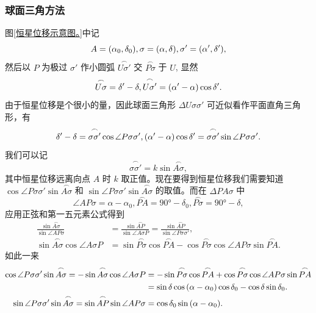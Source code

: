 \documentclass[UTF8, 12pt, a4paper, oneside, onecolumn, fontset=none]{ctexart}
\begin{document}
\subsubsection{球面三角方法}
图\ref{恒星位移示意图。}中记
\begin{equation}
A=\mleft(\alpha_{0},\delta_{0}\mright),\sigma=\mleft(\alpha,\delta\mright),\sigma'=\mleft(\alpha',\delta'\mright),
\end{equation}
然后以 $P$ 为极过 $\sigma'$ 作小圆弧 $\overset{\frown}{U\sigma'}$ 交 $\overset{\frown}{P\sigma}$ 于 $U$, 显然
\begin{equation}
\overset{\frown}{U\sigma}=\delta'-\delta,\overset{\frown}{U\sigma'}=\mleft(\alpha'-\alpha\mright)\cos{\delta'}.
\end{equation}
由于恒星位移是个很小的量，因此球面三角形 $\Delta{}U\sigma\sigma'$ 可近似看作平面直角三角形，有
\begin{equation}
\delta'-\delta=\overset{\frown}{\sigma\sigma'}\cos{\angle{P\sigma\sigma'}},\mleft(\alpha'-\alpha\mright)\cos{\delta'}=\overset{\frown}{\sigma\sigma'}\sin{\angle{P\sigma\sigma'}}.
\end{equation}
我们可以记
\begin{equation}
\overset{\frown}{\sigma\sigma'}=k\sin{\overset{\frown}{A\sigma}},
\end{equation}
其中恒星位移远离向点 $A$ 时 $k$ 取正值。现在要得到恒星位移我们需要知道 $\cos{\angle{P\sigma\sigma'}}\sin{\overset{\frown}{A\sigma}}$ 和 $\sin{\angle{P\sigma\sigma'}}\sin{\overset{\frown}{A\sigma}}$ 的取值。而在 $\Delta{}PA\sigma$ 中
\begin{equation}
\angle{AP\sigma}=\alpha-\alpha_{0},\overset{\frown}{PA}=\ang{90;;}-\delta_{0},\overset{\frown}{P\sigma}=\ang{90;;}-\delta,
\end{equation}
应用正弦和第一五元素公式得到
\begin{align}
\frac{\sin{\overset{\frown}{A\sigma}}}{\sin{\angle{AP\sigma}}}&=\frac{\sin{\overset{\frown}{AP}}}{\sin{\angle{A\sigma P}}}=\frac{\sin{\overset{\frown}{AP}}}{\sin{\angle{P\sigma\sigma'}}},\\
\sin{\overset{\frown}{A\sigma}}\cos{\angle{A\sigma{}P}}&=\sin{\overset{\frown}{P\sigma}}\cos{\overset{\frown}{PA}}-\cos{\overset{\frown}{P\sigma}}\cos{\angle{AP\sigma}}\sin{\overset{\frown}{PA}}.
\end{align}
如此一来
\begin{align}
\cos{\angle{P\sigma\sigma'}}\sin{\overset{\frown}{A\sigma}}=-\sin{\overset{\frown}{A\sigma}}\cos{\angle{A\sigma P}}&=-\sin{\overset{\frown}{P\sigma}}\cos{\overset{\frown}{PA}}+\cos{\overset{\frown}{P\sigma}}\cos{\angle{AP\sigma}}\sin{\overset{\frown}{PA}}\notag\\
&=\sin{\delta}\cos{\mleft(\alpha-\alpha_{0}\mright)}\cos{\delta_{0}}-\cos{\delta}\sin{\delta_{0}}.\\
\sin{\angle{P\sigma\sigma'}}\sin{\overset{\frown}{A\sigma}}=\sin{\overset{\frown}{AP}}\sin{\angle{AP\sigma}}&=\cos{\delta_{0}}\sin{\mleft(\alpha-\alpha_{0}\mright)}.
\end{align}
\end{document}
